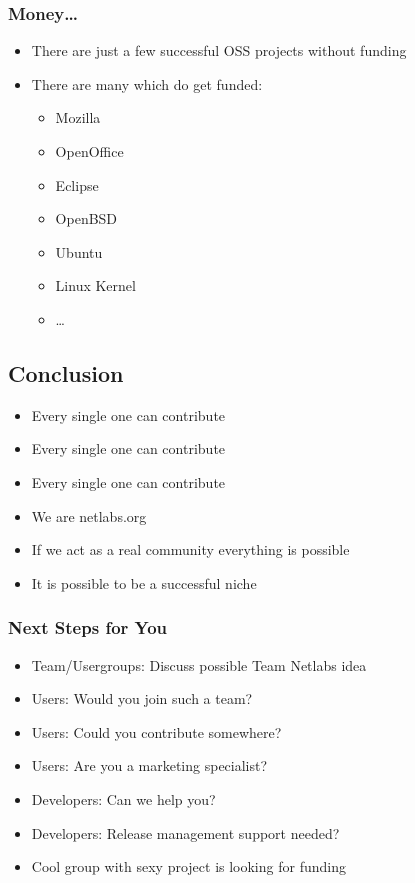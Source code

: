 \documentclass{beamer}
\begin{document}
\begin{frame}
\frametitle{Money\ldots}
\begin{itemize}[<+->]
  \item There are just a few successful OSS projects without funding
  \item There are many which do get funded:
  \begin{itemize}[<+->]
    \item Mozilla
    \item OpenOffice
    \item Eclipse
    \item OpenBSD
    \item Ubuntu
    \item Linux Kernel
    \item \ldots
  \end{itemize}
\end{itemize}
\end{frame}

\subsection{Conclusion}
\begin{frame}
\begin{itemize}[<+->]
  \item Every single one can contribute
  \item Every single one can contribute
  \item Every single one can contribute
  \item We are netlabs.org
  \item If we act as a real community everything is possible
  \item It is possible to be a successful niche
\end{itemize}
\end{frame}

\begin{frame}
\frametitle{Next Steps for You}
\begin{itemize}[<+->]
  \item Team/Usergroups: Discuss possible Team Netlabs idea
  \item Users: Would you join such a team?
  \item Users: Could you contribute somewhere?
  \item Users: Are you a marketing specialist?
  \item Developers: Can we help you?
  \item Developers: Release management support needed?
  \item Cool group with sexy project is looking for funding \texttrademark
\end{itemize}
\end{frame}
\end{document}
